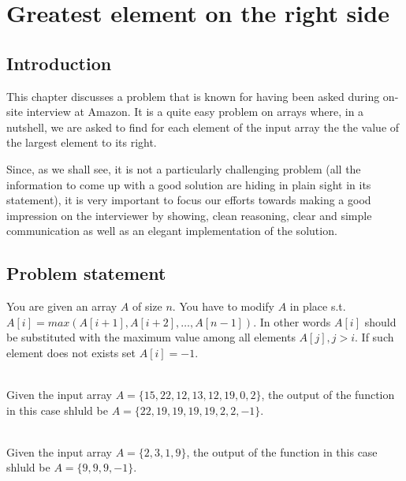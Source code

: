 %


\chapter{Greatest element on the right side}
\label{ch:greatest_right}
\section*{Introduction}
This chapter discusses a problem that is known for having been asked during on-site interview at Amazon. 
It is a quite easy problem on arrays where, in a nutshell, we are asked to find for each element of the input array the the value of the largest element to its right. 

Since, as we shall see, it is not a particularly challenging problem (all the information to come up with a good solution are hiding in plain sight in its statement), it is very important to focus our efforts towards making a good impression on the interviewer by showing, clean reasoning, clear and simple communication as well as an elegant implementation of the solution.



\section{Problem statement}
\begin{exercise}
You are given an array $A$ of size $n$. You have to modify $A$ in place s.t. $A[i] = max(A[i+1], A[i+2],\ldots, A[n-1])$. In other words $A[i]$ should be substituted with  the maximum value among all elements $A[j], j > i$. If such element does not exists set $A[i] = -1$.

	\begin{example}
		\hfill \\
		Given the input array $A = \{15, 22, 12, 13, 12, 19, 0, 2\}$, the output of the function in this case shluld be  $A = \{22, 19, 19, 19, 19, 2, 2, -1\}$.
	\end{example}

	\begin{example}
		\hfill \\
		Given the input array $A = \{2, 3, 1, 9\}$, the output of the function in this case shluld be  $A = \{9, 9, 9, -1\}$.
	\end{example}

\end{exercise}


